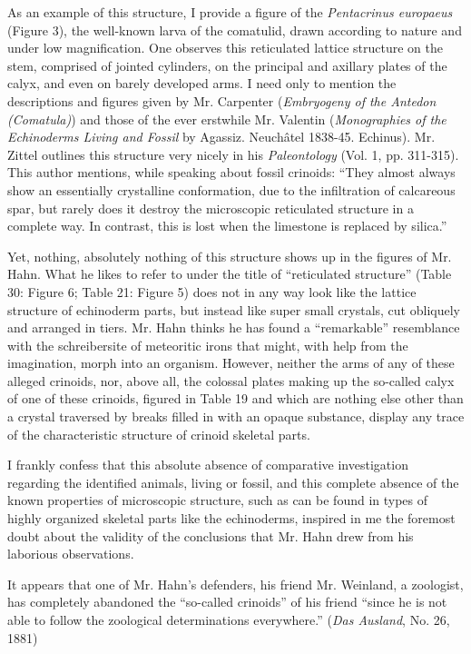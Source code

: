 \documentclass[a4paper, 12pt, oneside]{article}
\begin{document}
As an example of this structure, I provide a figure of the \emph{Pentacrinus europaeus} (Figure 3), the well-known larva of the comatulid, drawn according to nature and under low magnification. One observes this reticulated lattice structure on the stem, comprised of jointed cylinders, on the principal and axillary plates of the calyx, and even on barely developed arms. I need only to mention the descriptions and figures given by Mr. Carpenter (\emph{Embryogeny of the Antedon (Comatula)}) and those of the ever erstwhile Mr. Valentin (\emph{Monographies of the Echinoderms Living and Fossil} by Agassiz. Neuchâtel 1838-45. Echinus). Mr. Zittel outlines this structure very nicely in his \emph{Paleontology} (Vol. 1, pp. 311-315). This author mentions, while speaking about fossil crinoids: ``They almost always show an essentially crystalline conformation, due to the infiltration of calcareous spar, but rarely does it destroy the microscopic reticulated structure in a complete way. In contrast, this is lost when the limestone is replaced by silica.''

Yet, nothing, absolutely nothing of this structure shows up in the figures of Mr. Hahn. What he likes to refer to under the title of ``reticulated structure'' (Table 30: Figure 6; Table 21: Figure 5) does not in any way look like the lattice structure of echinoderm parts, but instead like super small crystals, cut obliquely and arranged in tiers. Mr. Hahn thinks he has found a ``remarkable'' resemblance with the schreibersite of meteoritic irons that might, with help from the imagination, morph into an organism. However, neither the arms of any of these alleged crinoids, nor, above all, the colossal plates making up the so-called calyx of one of these crinoids, figured in Table 19 and which are nothing else other than a crystal traversed by breaks filled in with an opaque substance, display any trace of the characteristic structure of crinoid skeletal parts.

I frankly confess that this absolute absence of comparative investigation regarding the identified animals, living or fossil, and this complete absence of the known properties of microscopic structure, such as can be found in types of highly organized skeletal parts like the echinoderms, inspired in me the foremost doubt about the validity of the conclusions that Mr. Hahn drew from his laborious observations.

It appears that one of Mr. Hahn's defenders, his friend Mr. Weinland, a zoologist, has completely abandoned the ``so-called crinoids'' of his friend ``since he is not able to follow the zoological determinations everywhere.'' (\emph{Das Ausland}, No. 26, 1881)
\end{document}
